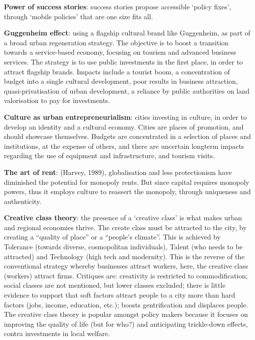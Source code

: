 \documentclass{article}
\newcommand{\alignedmarginpar}[1]{%
        \marginpar{\raggedright\small #1}
    }
\begin{document}
\textbf{Power of success stories}: success stories propose accessible `policy fixes', through `mobile policies' that are one size fits all.

\textbf{Guggenheim effect}: using a flagship cultural brand like Guggenheim, as part of a broad urban regeneration strategy. The objective is to boost a transition towards a service-based economy, focusing on tourism and advanced business services. The strategy is to use public investments in the first place, in order to attract flagship brands. Impacts include a tourist boom, a concentration of budget into a single cultural development, poor results in business attraction, quasi-privatisation of urban development, a reliance by public authorities on land valorisation to pay for investments.

\textbf{Culture as urban entrepreneurialism}: \alignedmarginpar{European Capital of Culture} cities investing in culture, in order to develop an identity and a cultural economy. Cities are places of promotion, and should showcase themselves. Budgets are concentrated in a selection of places and institutions, at the expense of others, and there are uncertain longterm impacts regarding the use of equipment and infrastructure, and tourism visits.

\textbf{The art of rent}: (Harvey, 1989), globalisation and less protectionism have diminished the potential for monopoly rents. But since capital requires monopoly powers, thus it employs culture to reassert the monopoly, through uniqueness and authenticity. 

\textbf{Creative class theory}: the presence of a `creative class' is what makes urban and regional economies thrive. The create class must be attracted to the city, by creating a ``quality of place'' or a ``people's climate''. This is achieved by Tolerance (towards diverse, cosmopolitan individuals), Talent (who needs to be attracted) and Technology (high tech and modernity). This is the reverse of the conventional strategy whereby businesses attract workers, here, the creative class (workers) attract firms. Critiques are: creativity is restricted to commodification; social classes are not mentioned, but lower classes excluded; there is little evidence to support that soft factors attract people to a city more than hard factors (jobs, income, education, etc.); boosts gentrification and displaces people. The creative class theory is popular amongst policy makers because it focuses on improving the quality of life (but for who?) and anticipating trickle-down effects, contra investments in local welfare.
\end{document}

